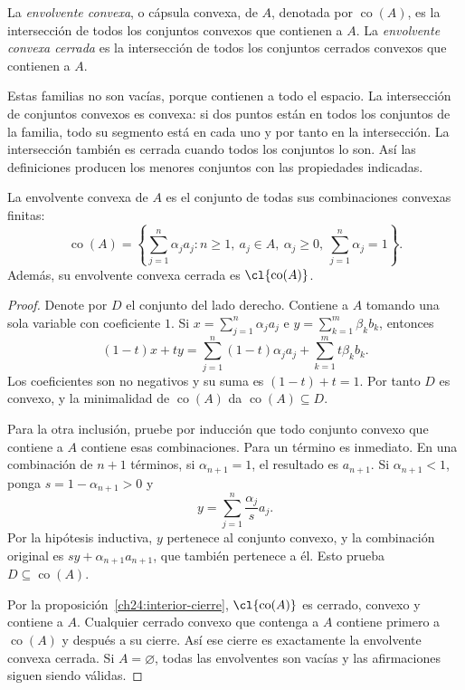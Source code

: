 \begin{definicion}
La \emph{envolvente convexa}, o cápsula convexa, de $A$, denotada por $\operatorname{co}(A)$, es la intersección de todos los conjuntos convexos que contienen a $A$. La \emph{envolvente convexa cerrada} es la intersección de todos los conjuntos cerrados convexos que contienen a $A$.
\end{definicion}

Estas familias no son vacías, porque contienen a todo el espacio. La intersección de conjuntos convexos es convexa: si dos puntos están en todos los conjuntos de la familia, todo su segmento está en cada uno y por tanto en la intersección. La intersección también es cerrada cuando todos los conjuntos lo son. Así las definiciones producen los menores conjuntos con las propiedades indicadas.

\begin{proposicion}\label{ch24:combinaciones}
La envolvente convexa de $A$ es el conjunto de todas sus combinaciones convexas finitas:
\[
 \operatorname{co}(A)=
 \left\{\sum_{j=1}^n\alpha_ja_j:
 n\geq1,\ a_j\in A,\ \alpha_j\geq0,\ \sum_{j=1}^n\alpha_j=1\right\}.
\]
Además, su envolvente convexa cerrada es $\cl{\operatorname{co}(A)}$.
\end{proposicion}
\begin{proof}
Denote por $D$ el conjunto del lado derecho. Contiene a $A$ tomando una sola variable con coeficiente $1$. Si $x=\sum_{j=1}^n\alpha_ja_j$ e $y=\sum_{k=1}^m\beta_kb_k$, entonces
\[
 (1-t)x+ty=\sum_{j=1}^n(1-t)\alpha_ja_j+\sum_{k=1}^m t\beta_kb_k.
\]
Los coeficientes son no negativos y su suma es $(1-t)+t=1$. Por tanto $D$ es convexo, y la minimalidad de $\operatorname{co}(A)$ da $\operatorname{co}(A)\subseteq D$.

Para la otra inclusión, pruebe por inducción que todo conjunto convexo que contiene a $A$ contiene esas combinaciones. Para un término es inmediato. En una combinación de $n+1$ términos, si $\alpha_{n+1}=1$, el resultado es $a_{n+1}$. Si $\alpha_{n+1}<1$, ponga $s=1-\alpha_{n+1}>0$ y
\[
 y=\sum_{j=1}^n\frac{\alpha_j}{s}a_j.
\]
Por la hipótesis inductiva, $y$ pertenece al conjunto convexo, y la combinación original es $sy+\alpha_{n+1}a_{n+1}$, que también pertenece a él. Esto prueba $D\subseteq\operatorname{co}(A)$.

Por la proposición~\ref{ch24:interior-cierre}, $\cl{\operatorname{co}(A)}$ es cerrado, convexo y contiene a $A$. Cualquier cerrado convexo que contenga a $A$ contiene primero a $\operatorname{co}(A)$ y después a su cierre. Así ese cierre es exactamente la envolvente convexa cerrada. Si $A=\varnothing$, todas las envolventes son vacías y las afirmaciones siguen siendo válidas.
\end{proof}

